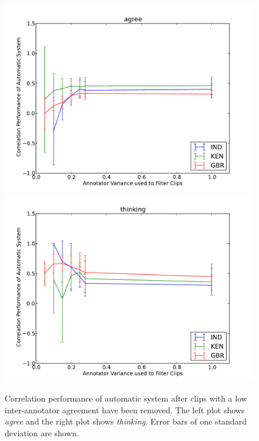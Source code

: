 \begin{figure}
\centering
\includegraphics[width = 0.49 \columnwidth]{nvcregression/interannotator/clipfilterperf-agree.pdf}
\includegraphics[width = 0.49 \columnwidth]{nvcregression/interannotator/clipfilterperf-thinking.pdf}
\caption[Correlation performance of automatic system after clips with a low inter-annotator agreement have been removed.]{Correlation performance of automatic system after clips with a low inter-annotator agreement have been removed. The left plot shows \textit{agree} and the right plot shows \textit{thinking}. Error bars of one standard deviation are shown.}
\label{FigureInterannotatorFilteredPerformanceA}
\end{figure}

